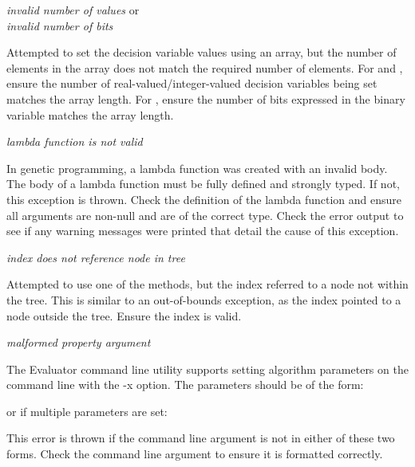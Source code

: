 \noindent
\textit{invalid number of values} or\\
\textit{invalid number of bits}
\begin{indented}
  Attempted to set the decision variable values using an array, but the number of elements in the array does not match the required number of elements. For  and , ensure the number of real-valued/integer-valued decision variables being set matches the array length.  For , ensure the number of bits expressed in the binary variable matches the array length.
\end{indented}

\noindent
\textit{lambda function is not valid}
\begin{indented}
  In genetic programming, a lambda function was created with an invalid body. The body of a lambda function must be fully defined and strongly typed.  If not, this exception is thrown.  Check the definition of the lambda function and ensure all arguments are non-null and are of the correct type.  Check the error output to see if any warning messages were printed that detail the cause of this exception.
\end{indented}

\noindent
\textit{index does not reference node in tree}
\begin{indented}
  Attempted to use one of the  methods, but the index referred to a node not within the tree.  This is similar to an out-of-bounds exception, as the index pointed to a node outside the tree.  Ensure the index is valid.
\end{indented}

\noindent
\textit{malformed property argument}
\begin{indented}
  The Evaluator command line utility supports setting algorithm parameters on the command line with the -x option.  The parameters should be of the form:
  \begin{indented}
  \end{indented}
  or if multiple parameters are set:
  \begin{indented}
  \end{indented}
  This error is thrown if the command line argument is not in either of these two forms.  Check the command line argument to ensure it is formatted correctly.
\end{indented}

